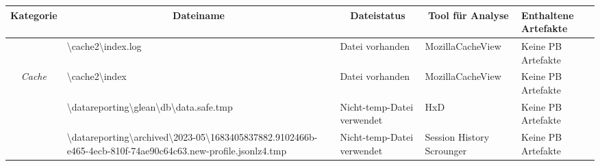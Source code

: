\begin{appendices}
{\begin{landscape}
\begin{table}[h!]
{\begin{tabular}{cllll}
	\multicolumn{1}{|c|}{\textbf{Kategorie}}                                                                     & \multicolumn{1}{c|}{\textbf{Dateiname}}                                                                                                                                                                             & \multicolumn{1}{c|}{\textbf{Dateistatus}}                                                         & \multicolumn{1}{c|}{\textbf{Tool für Analyse}}   & \multicolumn{1}{l|}{\textbf{Enthaltene Artefakte}}              \\ \hline
	\multicolumn{1}{|c|}{}                                                                                       & \multicolumn{1}{l|}{\cellcolor[HTML]{34CDF9}\textbackslash{}cache2\textbackslash{}index.log}                                                                                                                        & \multicolumn{1}{l|}{\cellcolor[HTML]{009901}Datei vorhanden}                                      & \multicolumn{1}{l|}{MozillaCacheView}            & \multicolumn{1}{l|}{\cellcolor[HTML]{F8A102}Keine PB Artefakte} \\ \cline{2-5} 
	\multicolumn{1}{|c|}{\multirow{-2}{*}{\textit{Cache}}}                                                       & \multicolumn{1}{l|}{\cellcolor[HTML]{34CDF9}\textbackslash{}cache2\textbackslash{}index}                                                                                                                            & \multicolumn{1}{l|}{\cellcolor[HTML]{009901}Datei vorhanden}                                      & \multicolumn{1}{l|}{MozillaCacheView}            & \multicolumn{1}{l|}{\cellcolor[HTML]{F8A102}Keine PB Artefakte} \\ \hline
	\multicolumn{1}{|c|}{}                                                                                       & \multicolumn{1}{l|}{\cellcolor[HTML]{3190FF}\textbackslash{}datareporting\textbackslash{}glean\textbackslash{}db\textbackslash{}data.safe.tmp}                                                                      & \multicolumn{1}{l|}{\cellcolor[HTML]{FCFF2F}Nicht-temp-Datei verwendet}                           & \multicolumn{1}{l|}{HxD}                         & \multicolumn{1}{l|}{\cellcolor[HTML]{F8A102}Keine PB Artefakte} \\ \cline{2-5} 
	\multicolumn{1}{|c|}{}                                                                                       & \multicolumn{1}{l|}{\cellcolor[HTML]{3190FF}\textbackslash{}datareporting\textbackslash{}archived\textbackslash{}2023-05\textbackslash{}1683405837882.9102466b-e465-4ecb-810f-74ae90c64c63.new-profile.jsonlz4.tmp} & \multicolumn{1}{l|}{\cellcolor[HTML]{FCFF2F}Nicht-temp-Datei verwendet}                           & \multicolumn{1}{l|}{Session History Scrounger}   & \multicolumn{1}{l|}{\cellcolor[HTML]{F8A102}Keine PB Artefakte} \\ \cline{2-5} 

\end{tabular}}
\end{table}
\end{landscape}}
\end{appendices}
